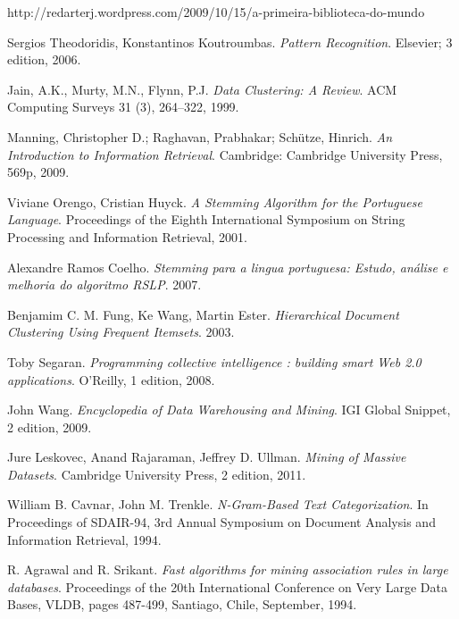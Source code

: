 \documentclass[a4paper,12pt]{article}
\begin{document}
\newpage

\begin{thebibliography}{9}

    http://redarterj.wordpress.com/2009/10/15/a-primeira-biblioteca-do-mundo

    Sergios Theodoridis, Konstantinos Koutroumbas.
    \emph{Pattern Recognition}.
    Elsevier; 3 edition,
    2006.
    
    Jain, A.K., Murty, M.N., Flynn, P.J.
    \emph{Data Clustering: A Review}.
    ACM Computing Surveys 31 (3), 264–322,
    1999.
    
    Manning, Christopher D.; Raghavan, Prabhakar; Schütze, Hinrich.
    \emph{An Introduction to Information Retrieval}.
    Cambridge: Cambridge University Press, 569p,
    2009.
    
    Viviane Orengo, Cristian Huyck.
    \emph{A Stemming Algorithm for the Portuguese Language}.
    Proceedings of the Eighth International Symposium on String Processing and Information Retrieval,
    2001.

    Alexandre Ramos Coelho.
    \emph{Stemming para a lingua portuguesa: Estudo, análise e melhoria do algoritmo RSLP}.
    2007.
    
    Benjamim C. M. Fung, Ke Wang, Martin Ester.
    \emph{Hierarchical Document Clustering Using Frequent Itemsets}.
    2003.
    
    Toby Segaran.
    \emph{Programming collective intelligence : building smart Web 2.0 applications}.
    O’Reilly, 1 edition,
    2008.
    
    John Wang.
    \emph{Encyclopedia of Data Warehousing and Mining}.
    IGI Global Snippet, 2 edition,
    2009.
    
    Jure Leskovec, Anand Rajaraman, Jeffrey D. Ullman.
    \emph{Mining of Massive Datasets}.
    Cambridge University Press, 2 edition,
    2011.
    
    William B. Cavnar, John M. Trenkle.
    \emph{N-Gram-Based Text Categorization}.
    In Proceedings of SDAIR-94, 3rd Annual Symposium on Document Analysis and Information Retrieval,
    1994.
    
    R. Agrawal and R. Srikant.
    \emph{Fast algorithms for mining association rules in large databases}.
    Proceedings of the 20th International Conference on Very Large Data Bases, VLDB, pages 487-499, Santiago, Chile,
    September, 1994.


\end{thebibliography}
\end{document}
